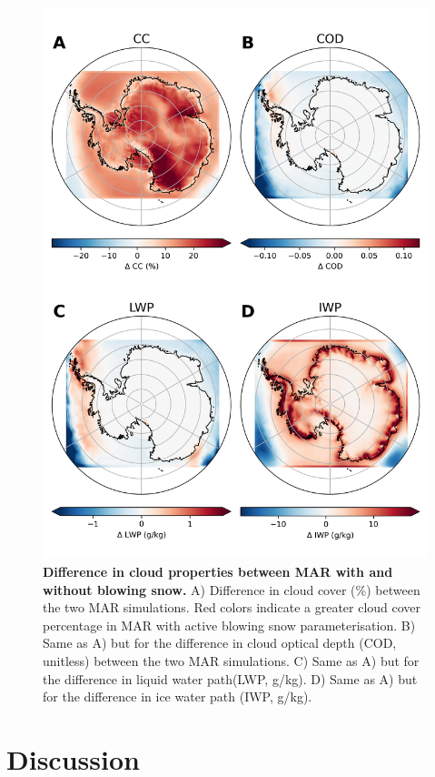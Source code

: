 \documentclass[12pt]{article}
\begin{document}
\begin{figure}[H]
	\includegraphics[scale=0.7,center]{microphysics.png}
	\caption{\textbf{Difference in cloud properties between MAR with and without blowing snow.} A) Difference in cloud cover (\%) between the two MAR simulations. Red colors indicate a greater cloud cover percentage in MAR with active blowing snow parameterisation. B) Same as A) but for the difference in cloud optical depth (COD, unitless) between the two MAR simulations. C) Same as A) but for the difference in liquid water path(LWP, g/kg). D) Same as A) but for the difference in ice water path (IWP, g/kg).}
	\label{fig:micro}
\end{figure}

\section*{Discussion}
\end{document}
